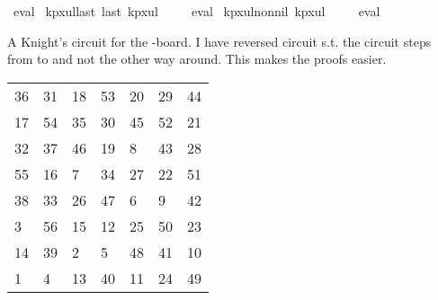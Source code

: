 \begin{isabellebody}
\ eval%
\endisatagproof
{\isafoldproof}%
%
\isadelimproof
%
\endisadelimproof
\isanewline
\isanewline
{}\isamarkupfalse%
\ kp{\isacharunderscore}{\kern0pt}{}x{}{\isacharunderscore}{\kern0pt}ul{\isacharunderscore}{\kern0pt}last{\isacharcolon}{\kern0pt}\ {\isachardoublequoteopen}last\ kp{}x{}ul\ {\isacharequal}{\kern0pt}\ {\isacharparenleft}{\kern0pt}{}{\isacharcomma}{\kern0pt}{}{\isacharparenright}{\kern0pt}{\isachardoublequoteclose}%
\isadelimproof
\ %
\endisadelimproof
%
\isatagproof
{}\isamarkupfalse%
\ eval%
\endisatagproof
{\isafoldproof}%
%
\isadelimproof
%
\endisadelimproof
\isanewline
\isanewline
{}\isamarkupfalse%
\ kp{\isacharunderscore}{\kern0pt}{}x{}{\isacharunderscore}{\kern0pt}ul{\isacharunderscore}{\kern0pt}non{\isacharunderscore}{\kern0pt}nil{\isacharcolon}{\kern0pt}\ {\isachardoublequoteopen}kp{}x{}ul\ {\isasymnoteq}\ {\isacharbrackleft}{\kern0pt}{\isacharbrackright}{\kern0pt}{\isachardoublequoteclose}%
\isadelimproof
\ %
\endisadelimproof
%
\isatagproof
{}\isamarkupfalse%
\ eval%
\endisatagproof
{\isafoldproof}%
%
\isadelimproof
%
\endisadelimproof
%
\begin{isamarkuptext}%
A Knight's circuit for the -board. I have reversed circuit s.t. the circuit steps 
from  to  and not the other way around. This makes the proofs easier.
  \begin{table}[H]
    \begin{tabular}{lllllll}
      36 & 31 & 18 & 53 & 20 & 29 & 44 \\
      17 & 54 & 35 & 30 & 45 & 52 & 21 \\
      32 & 37 & 46 & 19 &  8 & 43 & 28 \\
      55 & 16 &  7 & 34 & 27 & 22 & 51 \\
      38 & 33 & 26 & 47 &  6 &  9 & 42 \\
       3 & 56 & 15 & 12 & 25 & 50 & 23 \\
      14 & 39 &  2 &  5 & 48 & 41 & 10 \\
       1 &  4 & 13 & 40 & 11 & 24 & 49 
    \end{tabular}

\end{table}
\end{isamarkuptext}
\end{isabellebody}

